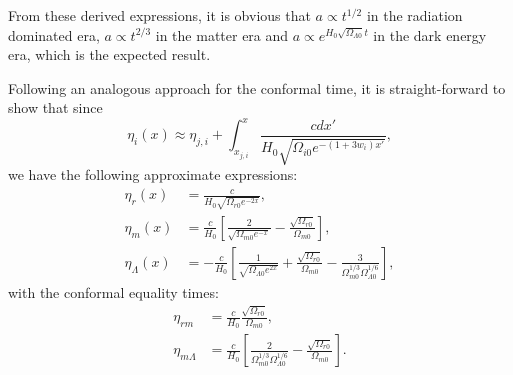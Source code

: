 \documentclass{aa}
\numberwithin{equation}{section}
\numberwithin{table}{section}
\numberwithin{figure}{section}
\begin{document}
From these derived expressions, it is obvious that $a\propto t^{1/2}$ in the radiation dominated era, $a\propto t^{2/3}$ in the matter era and $a\propto e^{H_0\sqrt{\Omega_{\Lambda0}}t}$ in the dark energy era, which is the expected result.

Following an analogous approach for the conformal time, it is straight-forward to show that since
\begin{equation}
  \eta_i(x) \approx \eta_{j,i} + \int_{x_{j,i}}^{x}\frac{cdx'}{H_0\sqrt{\Omega_{i0}e^{-(1+3w_i)x'}}},
\end{equation}
we have the following approximate expressions:
\begin{align}
  \eta_r(x) &= \frac{c}{H_0\sqrt{\Omega_{r0}e^{-2x}}},
  \\
  \eta_m(x) &= \frac{c}{H_0}\left[\frac{2}{\sqrt{\Omega_{m0}e^{-x}}} - \frac{\sqrt{\Omega_{r0}}}{\Omega_{m0}} \right],
  \\
  \eta_\Lambda(x) &= -\frac{c}{H_0}\left[\frac{1}{\sqrt{\Omega_{\Lambda0}e^{2x}}} +\frac{\sqrt{\Omega_{r0}}}{\Omega_{m0}} - \frac{3}{\Omega_{m0}^{1/3}\Omega_{\Lambda0}^{1/6}} \right],
\end{align}
with the conformal equality times:
\begin{align}
  \eta_{rm} &= \frac{c}{H_0}\frac{\sqrt{\Omega_{r0}}}{\Omega_{m0}},
  \\
  \eta_{m\Lambda} &= \frac{c}{H_0}\left[\frac{2}{\Omega_{m0}^{1/3}\Omega_{\Lambda0}^{1/6}} - \frac{\sqrt{\Omega_{r0}}}{\Omega_{m0}}\right].
\end{align}
\end{document}
